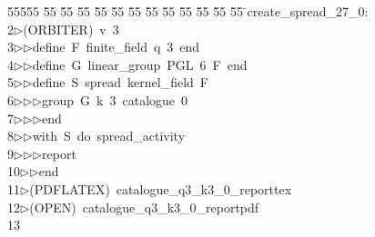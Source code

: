 %
%
\begin{tabbing}
55555 \= 55 \= 55 \= 55 \= 55 \= 55 \= 55 \= 55 \= 55 \= 55 \= 55 \= 55 \= 55 \= \>create\_spread\_27\_0:\\[0pt]
2\>$\triangleright$\>(ORBITER)\ v\ 3\ \\[0pt]
3\>$\triangleright$\>$\triangleright$\>define\ F\ finite\_field\ q\ 3\ end\ \\[0pt]
4\>$\triangleright$\>$\triangleright$\>define\ G\ linear\_group\ PGL\ 6\ F\ end\ \\[0pt]
5\>$\triangleright$\>$\triangleright$\>define\ S\ spread\ kernel\_field\ F\ \\[0pt]
6\>$\triangleright$\>$\triangleright$\>$\triangleright$\>group\ G\ k\ 3\ catalogue\ 0\ \\[0pt]
7\>$\triangleright$\>$\triangleright$\>$\triangleright$\>end\ \\[0pt]
8\>$\triangleright$\>$\triangleright$\>with\ S\ do\ spread\_activity\ \\[0pt]
9\>$\triangleright$\>$\triangleright$\>$\triangleright$\>report\ \\[0pt]
10\>$\triangleright$\>$\triangleright$\>end\\[0pt]
11\>$\triangleright$\>(PDFLATEX)\ catalogue\_q3\_k3\_0\_reporttex\\[0pt]
12\>$\triangleright$\>(OPEN)\ catalogue\_q3\_k3\_0\_reportpdf\\[0pt]
13\>\end{tabbing}
